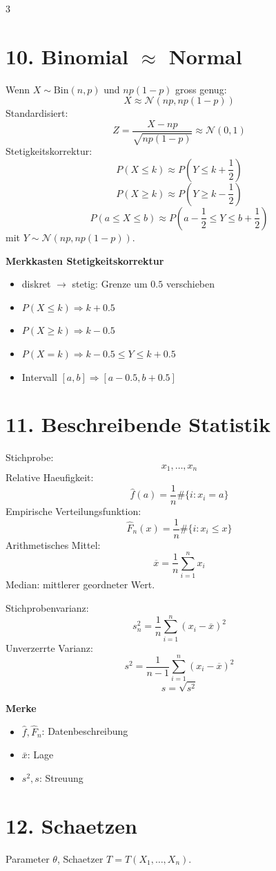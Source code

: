 \documentclass[a4paper,8pt,landscape]{article}
\newcommand{\Bin}{\mathrm{Bin}}
\newcommand{\Normal}{\mathcal{N}}
\begin{document}
\begin{multicols*}{3}
\section*{10. Binomial $\approx$ Normal}
Wenn $X\sim\Bin(n,p)$ und $np(1-p)$ gross genug:
\[
X\approx \Normal(np,np(1-p))
\]
Standardisiert:
\[
Z=\frac{X-np}{\sqrt{np(1-p)}}\approx \Normal(0,1)
\]
Stetigkeitskorrektur:
\[
P(X\le k)\approx P\left(Y\le k+\frac12\right)
\]
\[
P(X\ge k)\approx P\left(Y\ge k-\frac12\right)
\]
\[
P(a\le X\le b)\approx P\left(a-\frac12\le Y\le b+\frac12\right)
\]
mit $Y\sim\Normal(np,np(1-p))$.

\textbf{Merkkasten Stetigkeitskorrektur}
\begin{itemize}
  \item diskret $\to$ stetig: Grenze um $0.5$ verschieben
  \item $P(X\le k)\Rightarrow k+0.5$
  \item $P(X\ge k)\Rightarrow k-0.5$
  \item $P(X=k)\Rightarrow k-0.5 \le Y \le k+0.5$
  \item Intervall $[a,b]\Rightarrow [a-0.5,b+0.5]$
\end{itemize}

\section*{11. Beschreibende Statistik}
Stichprobe:
\[
x_1,\dots,x_n
\]
Relative Haeufigkeit:
\[
\hat f(a)=\frac{1}{n}\#\{i:x_i=a\}
\]
Empirische Verteilungsfunktion:
\[
\hat F_n(x)=\frac{1}{n}\#\{i:x_i\le x\}
\]
Arithmetisches Mittel:
\[
\overline x=\frac{1}{n}\sum_{i=1}^n x_i
\]
Median: mittlerer geordneter Wert.

Stichprobenvarianz:
\[
s_n^2=\frac{1}{n}\sum_{i=1}^n (x_i-\overline x)^2
\]
Unverzerrte Varianz:
\[
s^2=\frac{1}{n-1}\sum_{i=1}^n (x_i-\overline x)^2
\]
\[
s=\sqrt{s^2}
\]

\textbf{Merke}
\begin{itemize}
  \item $\hat f,\hat F_n$: Datenbeschreibung
  \item $\bar x$: Lage
  \item $s^2,s$: Streuung
\end{itemize}

\section*{12. Schaetzen}
Parameter $\theta$, Schaetzer $T=T(X_1,\dots,X_n)$.


\end{multicols*}
\end{document}
